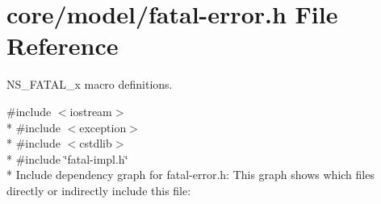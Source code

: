 \hypertarget{fatal-error_8h}{}\section{core/model/fatal-\/error.h File Reference}
\label{fatal-error_8h}


{\ttfamily N\+S\+\_\+\+F\+A\+T\+A\+L\+\_\+x} macro definitions.  


{\ttfamily \#include $<$iostream$>$}\\*
{\ttfamily \#include $<$exception$>$}\\*
{\ttfamily \#include $<$cstdlib$>$}\\*
{\ttfamily \#include \char`\"{}fatal-\/impl.\+h\char`\"{}}\\*
Include dependency graph for fatal-\/error.h\+:
This graph shows which files directly or indirectly include this file\+:
